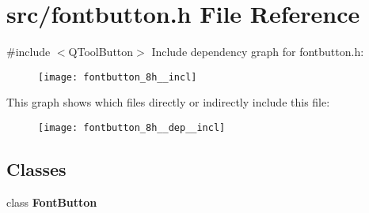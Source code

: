 \section{src/fontbutton.h File Reference}
\label{fontbutton_8h}
{\ttfamily \#include $<$Q\+Tool\+Button$>$}\newline
Include dependency graph for fontbutton.\+h\+:\nopagebreak
\begin{figure}[H]
\begin{center}
\leavevmode
\texttt{[image: fontbutton\_8h\_\_incl]}
\end{center}
\end{figure}
This graph shows which files directly or indirectly include this file\+:\nopagebreak
\begin{figure}[H]
\begin{center}
\leavevmode
\texttt{[image: fontbutton\_8h\_\_dep\_\_incl]}
\end{center}
\end{figure}
\subsection*{Classes}
\begin{DoxyCompactItemize}
\item 
class \textbf{ Font\+Button}
\end{DoxyCompactItemize}
